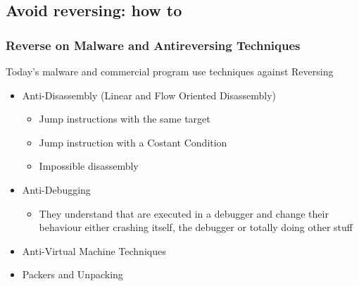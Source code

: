 \documentclass[]{beamer}
\begin{document}
	\subsection{Avoid reversing: how to}
		\begin{frame}
			\frametitle{Reverse on Malware and Antireversing Techniques}
			Today's malware and commercial program use techniques against Reversing
			\begin{itemize}
				\item{Anti-Disassembly (Linear and Flow Oriented Disassembly)}
					\begin{itemize}
						\item{Jump instructions with the same target}
						\item{Jump instruction with a Costant Condition}
						\item{Impossible disassembly}
					\end{itemize}
				\item{Anti-Debugging}
					\begin{itemize}
						\item{They understand that are executed in a debugger and change their behaviour either crashing itself, the debugger or totally doing other stuff}
					\end{itemize}
				\item{Anti-Virtual Machine Techniques}
				\item{Packers and Unpacking}
			\end{itemize}
		\end{frame}
\end{document}
